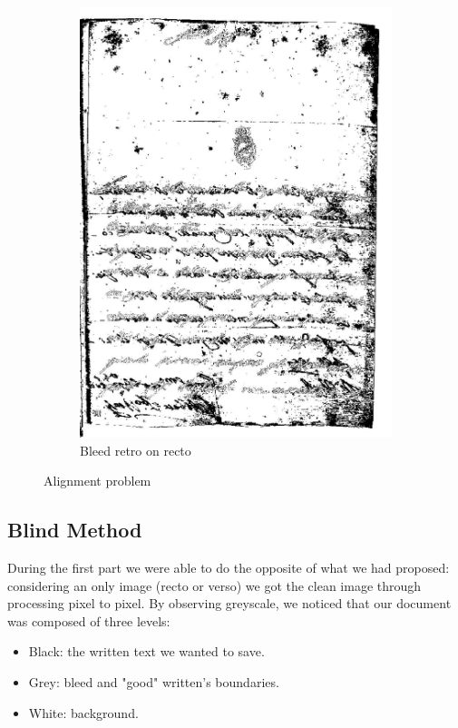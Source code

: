 \documentclass[%
 reprint,
 amsmath,amssymb,
 aps,
]{revtex4-1}
\begin{document}
\begin{figure}
\begin{subfigure}{.9\columnwidth}
\includegraphics[width=\columnwidth]{bleedRetroSuFronte}%
\caption{Bleed retro on recto}%
\label{subfigb}%
\end{subfigure}\hfill%
\caption{Alignment problem}
\label{figabc}
\end{figure}

\subsection{\label{sec:level4}Blind Method}
During the first part we were able to do the opposite of what we had proposed: considering an only image (recto or verso) we got the clean image through processing pixel to pixel.
By observing greyscale, we noticed that our document was composed of three levels:
\begin{itemize}
	\item Black: the written text we wanted to save.
	\item Grey: bleed and "good" written's boundaries.
	\item White: background.
\end{itemize}
\end{document}
